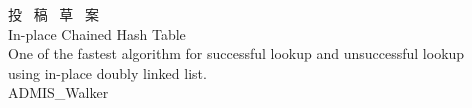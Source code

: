 \begin{titlepage}


\vspace*{120truept}
\begin{center}
  \huge{投 \ 稿 \ 草 \ 案}\\
  \vspace{30truept}
  \huge{In-place Chained Hash Table}\\ %
  \large{One of the fastest algorithm for successful lookup and unsuccessful lookup\\using in-place doubly linked list.}\\ %
\vspace{100truept}
\leavevmode \newline %
\leavevmode \newline %
\LARGE{ADMIS\_Walker}\\ %
\end{center}


\end{titlepage}
